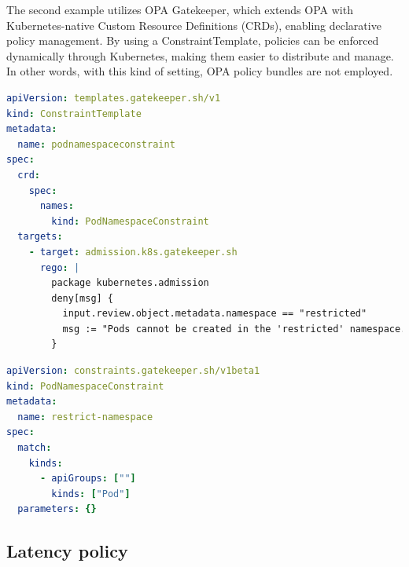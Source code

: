 The second example utilizes OPA Gatekeeper, which extends OPA with Kubernetes-native Custom Resource Definitions (CRDs), enabling declarative policy management. By using a ConstraintTemplate, policies can be enforced dynamically through Kubernetes, making them easier to distribute and manage.
In other words, with this kind of setting, OPA policy bundles are not employed.

\begin{lstlisting}[language=yaml, caption={OPA Gatekeeper ConstraintTemplate}, label={lst:gatekeeper-template}]
apiVersion: templates.gatekeeper.sh/v1
kind: ConstraintTemplate
metadata:
  name: podnamespaceconstraint
spec:
  crd:
    spec:
      names:
        kind: PodNamespaceConstraint
  targets:
    - target: admission.k8s.gatekeeper.sh
      rego: |
        package kubernetes.admission
        deny[msg] {
          input.review.object.metadata.namespace == "restricted"
          msg := "Pods cannot be created in the 'restricted' namespace."
        }
\end{lstlisting}

\begin{lstlisting}[language=yaml, caption={OPA Gatekeeper Constraint}, label={lst:gatekeeper-constraint}]
apiVersion: constraints.gatekeeper.sh/v1beta1
kind: PodNamespaceConstraint
metadata:
  name: restrict-namespace
spec:
  match:
    kinds:
      - apiGroups: [""]
        kinds: ["Pod"]
  parameters: {}
\end{lstlisting}







\subsection{Latency policy}

